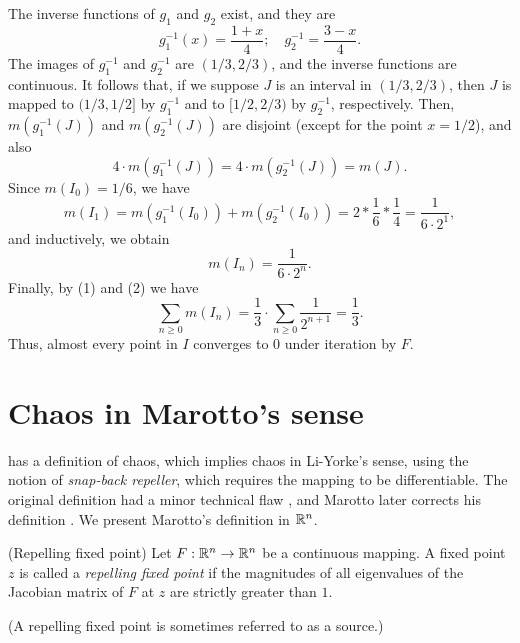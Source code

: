\documentclass[12pt,draft,twoside]{book}
\begin{document}
\begin{example}
The inverse functions of $g_1$ and $g_2$ exist, and they are
\begin{equation*}
  g_1^{-1}(x) = \frac{1+x}{4}; \quad g_2^{-1} = \frac{3-x}{4}.
\end{equation*}
The images of $g_1^{-1}$ and $g_2^{-1}$ are $(1/3,2/3)$, and the inverse functions are continuous.
It follows that, if we suppose $J$ is an interval in $(1/3,2/3)$, then $J$ is mapped to $(1/3,1/2]$ by $g_1^{-1}$ and to $[1/2,2/3)$ by $g_2^{-1}$, respectively.
Then, $m(g_1^{-1}(J))$ and $m(g_2^{-1}(J))$ are disjoint (except for the point $x = 1/2$), and also
\begin{equation*}
  4 \cdot m(g_1^{-1}(J)) = 4 \cdot m(g_2^{-1}(J)) = m(J).
\end{equation*}
Since $m(I_0) = 1/6$, we have
\begin{equation*}
  m(I_1) 
  = m(g_1^{-1}(I_0)) + m(g_2^{-1}(I_0))
  = 2 * \frac{1}{6} * \frac{1}{4}
  = \frac{1}{6\cdot 2^1},
\end{equation*}
and inductively, we obtain
\begin{equation*}
  m(I_n) = \frac{1}{6 \cdot 2^n}.
\end{equation*}
%
Finally, by (1) and (2) we have
\begin{equation*}
  \sum\limits_{n\geq 0} m(I_n)
  = \frac{1}{3} \cdot \sum\limits_{n\geq 0} \frac{1}{2^{n+1}}
  = \frac{1}{3}.
\end{equation*}
Thus, almost every point in $I$ converges to 0 under iteration by $F$.
\end{example}


\section{Chaos in Marotto's sense}
\citet{marotto1} has a definition of chaos, which implies chaos in Li-Yorke's sense, using the notion of \textit{snap-back repeller}, which requires the mapping to be differentiable.
The original definition had a minor technical flaw \citep{shi}, and Marotto later corrects his definition \citep{marotto2}.
We present Marotto's definition in $\mathbb{R}^n$.
\begin{definition}
  (Repelling fixed point)
  Let $F: \mathbb{R}^n \to \mathbb{R}^n$ be a continuous mapping. 
  A fixed point $z$ is called a \textit{repelling fixed point} if the magnitudes of all eigenvalues of the Jacobian matrix of $F$ at $z$ are strictly greater than $1$.
\end{definition}
(A repelling fixed point is sometimes referred to as a source.)
\end{document}
